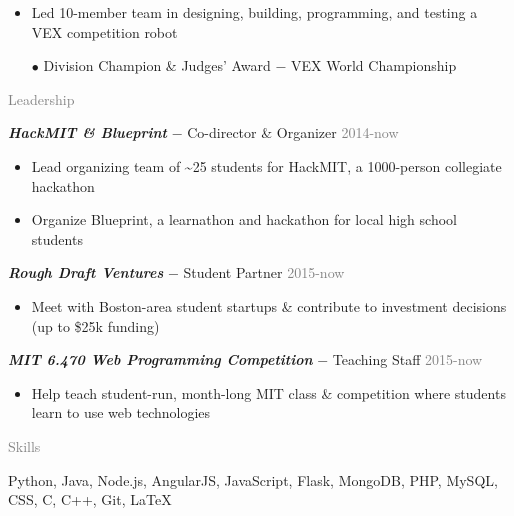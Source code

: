 \documentclass[11pt]{article}
\newcommand{\rsection}[1]{\vspace{1.5em}\textcolor{gray}{\Large \robotoslab #1}\vspace{0.5em}}
\newcommand{\bt}[1]{\textit{\textbf{#1}}} %
\newcommand{\gap}[0]{\vspace{0.5em}} %
\newcommand{\dash}[0]{ $-$ } %
\newcommand{\gray}[1]{\textcolor{gray}{#1}}
\begin{document}
\begin{itemize}
\item Led 10-member team in designing, building, programming, and testing a VEX competition robot
\item[$\bullet$] Division Champion \& Judges' Award\dash VEX World Championship
\end{itemize}

\rsection{Leadership}

\bt{HackMIT \& Blueprint}\dash Co-director \& Organizer \hfill \gray{2014-now}

\begin{itemize}
\item Lead organizing team of \textasciitilde 25 students for HackMIT, a 1000-person collegiate hackathon
\item Organize Blueprint, a learnathon and hackathon for local high school students
\end{itemize}

\gap

\bt{Rough Draft Ventures}\dash Student Partner \hfill \gray{2015-now}

\begin{itemize}
\item Meet with Boston-area student startups \& contribute to investment decisions (up to \$25k funding)
\end{itemize}

\gap

\bt{MIT 6.470 Web Programming Competition}\dash Teaching Staff \hfill \gray{2015-now}

\begin{itemize}
\item Help teach student-run, month-long MIT class \& competition where students learn to use web technologies
\end{itemize}

\rsection{Skills}

Python, Java, Node.js, AngularJS, JavaScript, Flask, MongoDB, PHP, MySQL, CSS, C, C++, Git, {\selectfont\LaTeX}
\end{document}
